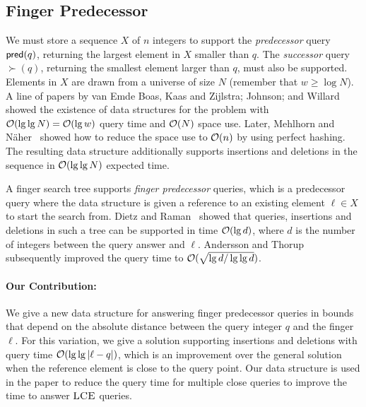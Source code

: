 \subsection{Finger Predecessor}
We must store a sequence $X$ of $n$ integers to support the \emph{predecessor} query $\mathsf{pred}(q)$, returning the largest element in $X$ smaller than $q$. The \emph{successor} query $\succ(q)$, returning the smallest element larger than $q$, must also be supported. Elements in $X$ are drawn from a universe of size $N$ (remember that $w \geq \log N$). 
A line of papers by van Emde Boas, Kaas and Zijlstra; Johnson; and Willard~ \cite{van1976design, van1977preserving, willard1983log, johnson1981priority} showed the existence of data structures for the problem with $\mathcal{O}(\lg \lg N) = \mathcal{O}(\lg w)$ query time and $\mathcal{O}(N)$ space use. Later, Mehlhorn and N{\"a}her~\cite{mehlhorn1990bounded} showed how to reduce the space use to $\mathcal{O}(n)$ by using perfect hashing. The resulting data structure additionally supports insertions and deletions in the sequence in $\mathcal{O}(\lg \lg N)$ expected time.


A finger search tree supports \emph{finger predecessor} queries, which is a predecessor query where the data structure is given a reference to an existing element $\ell \in X$ to start the search from. Dietz and Raman~\cite{dietz1994constant} showed that queries, insertions and deletions in such a tree can be supported in time $\mathcal{O}(\lg d)$, where $d$ is the number of integers between the query answer and $\ell$. Andersson and Thorup~\cite{andersson2000tight} subsequently improved the query time to $\mathcal{O}(\sqrt{\lg d / \lg \lg d})$. 


\paragraph{Our Contribution: } 
We give a new data structure for answering finger predecessor queries in bounds that depend on the absolute distance between the query integer $q$ and the finger $\ell$. For this variation, we give a solution supporting insertions and deletions with query time $\mathcal{O}(\lg \lg |\ell-q|)$, which is an improvement over the general solution when the reference element is close to the query point. Our data structure is used in the paper to reduce the query time for multiple close queries to improve the time to answer $\textsc{LCE}$ queries.


